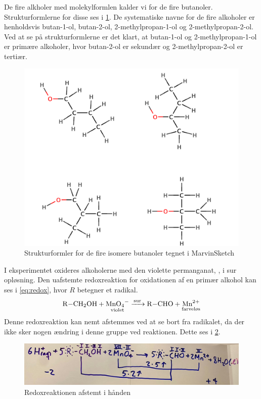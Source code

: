 \documentclass{report}
\begin{document}
De fire alkholer med molekylformlen  kalder vi for de fire butanoler.
Strukturformlerne for disse ses i \cref{fig:butanoler}.
De systematiske navne for de fire alkoholer er henholdsvis butan-1-ol, butan-2-ol, 2-methylpropan-1-ol og 2-methylpropan-2-ol.
Ved at se på strukturformlerne er det klart, at butan-1-ol og 2-methylpropan-1-ol er primære alkoholer, hvor butan-2-ol er sekundær og 2-methylpropan-2-ol er tertiær.
\begin{figure}[H]
\begin{center}
  \includegraphics[scale=0.45]{butanoler.png}
\end{center}
\caption{Strukturformler for de fire isomere butanoler tegnet i MarvinSketch}
\label{fig:butanoler}
\end{figure}
I eksperimentet oxideres alkoholerne med den violette permanganat, , i sur opløsning.
Den uafstemte redoxreaktion for oxidationen af en primær alkohol kan ses i \cref{eq:redox}, hvor $R$ betegner et radikal. 
\begin{equation}
\label{eq:redox}
\begin{split}
  \ce{R-CH2OH + \underset{\text{violet} }{\ce{MnO4-}} ->T[sur] R-CHO + \underset{\text{farveløs}}{\ce{Mn^2+} }}
\end{split}
\end{equation}
Denne redoxreaktion kan nemt afstemmes ved at se bort fra radikalet, da der ikke sker nogen ændring i denne gruppe ved reaktionen.
Dette ses i \cref{fig:redox}.
\begin{figure}[H]
\begin{center}
  \includegraphics[scale=0.3]{redox.jpg}
\end{center}
\caption{Redoxreaktionen afstemt i hånden}
\label{fig:redox}
\end{figure}
\end{document}
